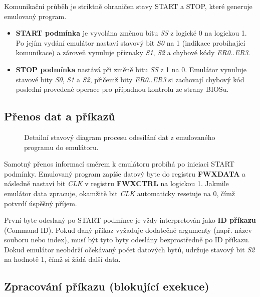 Komunikační průběh je striktně ohraničen stavy START a STOP, které generuje emulovaný program.

\begin{itemize}
    \item \textbf{START podmínka} je vyvolána změnou bitu \emph{SS} z logické 0 na logickou 1. Po
        jejím vydání emulátor nastaví stavový bit \emph{S0} na 1 (indikace probíhající komunikace) a
        zároveň vynuluje příznaky \emph{S1}, \emph{S2} a chybové kódy \emph{ER0..ER3}.
    \item \textbf{STOP podmínka} nastává při změně bitu \emph{SS} z 1 na 0. Emulátor vynuluje
        stavové bity \emph{S0}, \emph{S1} a \emph{S2}, přičemž bity \emph{ER0..ER3} si zachovají
        chybový kód poslední provedené operace pro případnou kontrolu ze strany BIOSu.
\end{itemize}

\subsection{Přenos dat a příkazů}

\begin{figure}[htbp]
    \centering
    
    \caption{Detailní stavový diagram procesu odesílání dat z emulovaného programu do emulátoru.}
    \label{fig:data_transfer_procedure}
\end{figure}

Samotný přenos informací směrem k emulátoru probíhá po iniciaci START podmínky. Emulovaný
program zapíše datový byte do registru \textbf{FWXDATA} a následně nastaví bit \emph{CLK} v registru
\textbf{FWXCTRL} na logickou 1. Jakmile emulátor data zpracuje, okamžitě bit \emph{CLK} automaticky
resetuje na 0, čímž potvrdí úspěšný příjem.

První byte odeslaný po START podmínce je vždy interpretován jako \textbf{ID příkazu} (Command ID).
Pokud daný příkaz vyžaduje dodatečné argumenty (např. název souboru nebo index), musí být tyto byty
odeslány bezprostředně po ID příkazu. Dokud emulátor neobdrží očekávaný počet datových bytů,
udržuje stavový bit \emph{S2} na hodnotě 1, čímž si žádá další data.

\subsection{Zpracování příkazu (blokující exekuce)}

